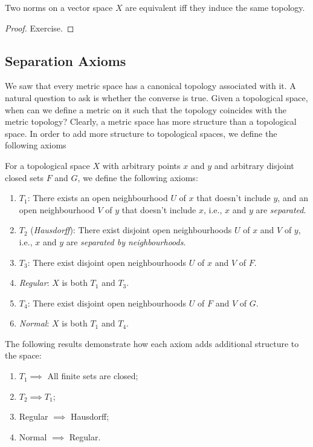 \documentclass[english,letterpaper]{article}%
\numberwithin{equation}{section}
\numberwithin{figure}{section}
\numberwithin{table}{section}
\theoremstyle{definition}
\theoremstyle{definition}
\theoremstyle{definition}
\theoremstyle{plain}
\theoremstyle{plain}
\theoremstyle{plain}
\theoremstyle{plain}
\theoremstyle{remark}
\theoremstyle{remark}
\begin{document}
\begin{thm}
Two norms on a vector space $X$ are equivalent iff they induce the same topology.
\end{thm}
\begin{proof}
Exercise.
\end{proof}

\subsection{Separation Axioms} \label{Separation Axioms}

We saw that every metric space has a canonical topology associated with it. A natural question to ask is whether the converse is true. Given a topological space, when can we define a metric on it such that the topology coincides with the metric topology? Clearly, a metric space has more structure than a topological space. In order to add more structure to topological spaces, we define the following axioms

\begin{defn}
For a topological space $X$ with arbitrary points $x$ and $y$ and arbitrary disjoint closed sets $F$ and $G$, we define the following axioms:
\begin{enumerate}
    \item $T_1$: There exists an open neighbourhood $U$ of $x$ that doesn't include $y$, and an open neighbourhood $V$ of $y$ that doesn't include $x$, i.e., $x$ and $y$ are \emph{separated}.
    \item $T_2$ (\emph{Hausdorff}): There exist disjoint open neighbourhoods $U$ of $x$ and $V$ of $y$, i.e., $x$ and $y$ are \emph{separated by neighbourhoods}.
    \item $T_3$: There exist disjoint open neighbourhoods $U$ of $x$ and $V$ of $F$.
    \item \emph{Regular}: $X$ is both $T_1$ and $T_3$.
    \item $T_4$: There exist disjoint open neighbourhoods $U$ of $F$ and $V$ of $G$.
    \item \emph{Normal}: $X$ is both $T_1$ and $T_4$.
\end{enumerate}
\end{defn}

\begin{prop}
The following results demonstrate how each axiom adds additional structure to the space:
\begin{enumerate}
    \item $T_1 \implies$ All finite sets are closed;
    \item $T_2\implies T_1$;
    \item Regular $\implies$ Hausdorff;
    \item Normal $\implies$ Regular.
\end{enumerate}
\end{prop}
\end{document}
